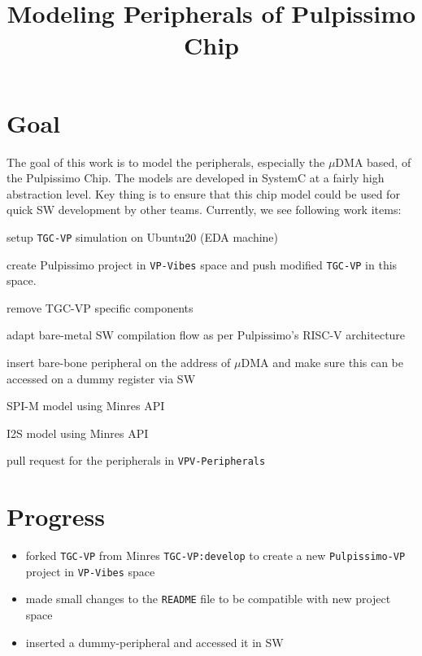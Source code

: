 \documentclass{article}
\title{Modeling Peripherals of Pulpissimo Chip}
\newcommand{\cmark}{\ding{51}}%
\newcommand{\done}{\rlap{$\square$}{\raisebox{2pt}{\large\hspace{1pt}\cmark}}%
\hspace{-2.5pt}}
\begin{document}
\maketitle


\section{Goal}
The goal of this work is to model the peripherals, especially the $\mu$DMA based, of the Pulpissimo Chip.
The models are developed in SystemC at a fairly high abstraction level. Key thing is to ensure that this
chip model could be used for quick SW development by other teams. Currently, we see following work items:

\begin{todolist}
 \item[\done] setup \texttt{TGC-VP} simulation on Ubuntu20 (EDA machine)
 \item[\done] create Pulpissimo project in \texttt{VP-Vibes} space and push modified \texttt{TGC-VP} in this space.
 \item remove TGC-VP specific components
 \item adapt bare-metal SW compilation flow as per Pulpissimo's RISC-V architecture
 \item[\done] insert bare-bone peripheral on the address of $\mu$DMA and make sure this can be accessed on a dummy register
 via SW
 \item SPI-M model using Minres API
 \item I2S model using Minres API
 \item pull request for the peripherals in \texttt{VPV-Peripherals}
\end{todolist}

\section{Progress}
\begin{itemize}
 \item forked \texttt{TGC-VP} from Minres \texttt{TGC-VP:develop} to create a new \texttt{Pulpissimo-VP} project in
       \texttt{VP-Vibes} space
 \item made small changes to the \texttt{README} file to be compatible with new project space
 \item inserted a dummy-peripheral and accessed it in SW

\end{itemize}
\end{document}
